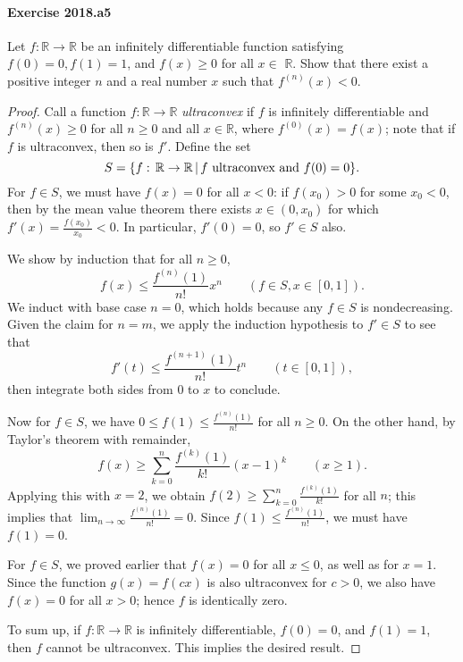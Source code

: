 \documentclass{article}
\begin{document}
\paragraph{Exercise 2018.a5} Let $f: \mathbb{R} \rightarrow \mathbb{R}$ be an infinitely differentiable function satisfying $f(0)=0, f(1)=1$, and $f(x) \geq 0$ for all $x \in$ $\mathbb{R}$. Show that there exist a positive integer $n$ and a real number $x$ such that $f^{(n)}(x)<0$.
\begin{proof}
    Call a function $f\colon \mathbb{R} \to \mathbb{R}$ \textit{ultraconvex} if $f$ is infinitely differentiable and $f^{(n)}(x) \geq 0$ for all $n \geq 0$ and all $x \in \mathbb{R}$, where $f^{(0)}(x) = f(x)$;
note that if $f$ is ultraconvex, then so is $f'$.
Define the set
\[
S = \{ f :\thinspace \mathbb{R} \to \mathbb{R} \,|\,f \text{ ultraconvex and } f(0)=0\}.
\]
For $f \in S$, we must have $f(x) = 0$ for all $x < 0$: if $f(x_0) > 0$ for some $x_0 < 0$, then
by the mean value theorem there exists $x \in (0,x_0)$ for which $f'(x) = \frac{f(x_0)}{x_0} < 0$.
In particular, $f'(0) = 0$, so $f' \in S$ also.

We show by induction that for all $n \geq 0$,
\[
f(x) \leq \frac{f^{(n)}(1)}{n!} x^n \qquad (f \in S, x \in [0,1]).
\]
We induct with base case $n=0$, which holds because any $f \in S$ is nondecreasing. Given the claim for $n=m$,
we apply the induction hypothesis to $f' \in S$ to see that
\[
f'(t) \leq \frac{f^{(n+1)}(1)}{n!} t^n \qquad (t \in [0,1]),
\]
then integrate both sides from $0$ to $x$ to conclude.

Now for $f \in S$, we have $0 \leq f(1) \leq \frac{f^{(n)}(1)}{n!}$ for all $n \geq 0$. 
On the other hand, by Taylor's theorem with remainder,
\[
f(x) \geq \sum_{k=0}^n \frac{f^{(k)}(1)}{k!}(x-1)^k \qquad (x \geq 1).
\]
Applying this with $x=2$, we obtain $f(2) \geq \sum_{k=0}^n \frac{f^{(k)}(1)}{k!}$ for all $n$;
this implies that $\lim_{n\to\infty}  \frac{f^{(n)}(1)}{n!} = 0$.
Since $f(1) \leq \frac{f^{(n)}(1)}{n!}$, we must have $f(1) = 0$.

For $f \in S$, we proved earlier that $f(x) = 0$ for all $x\leq 0$, as well as for $x=1$. Since
the function $g(x) = f(cx)$ is also ultraconvex for $c>0$, we also have $f(x) = 0$ for all $x>0$;
hence $f$ is identically zero.

To sum up, if $f\colon \mathbb{R} \to \mathbb{R}$ is infinitely differentiable, $f(0)=0$, and $f(1) = 1$,
then $f$ cannot be ultraconvex. This implies the desired result.
\end{proof}
\end{document}
